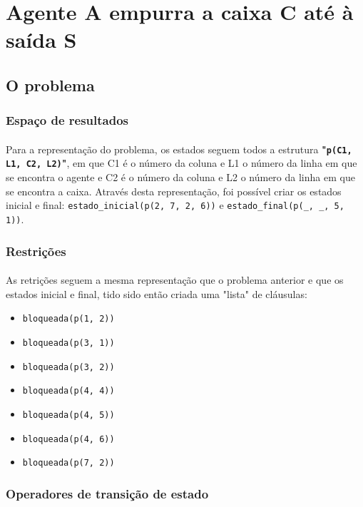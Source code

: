 \documentclass{article}
\begin{document}
\newpage

\section{Agente A empurra a caixa C até à saída S}
\subsection{O problema}
\subsubsection{Espaço de resultados}
\paragraph{} Para a representação do problema, os estados seguem todos a estrutura \textbf{"\texttt{p(C1, L1, C2, L2)}"}, em que C1 é o número da coluna e L1 o número da linha em que se encontra o agente e C2 é o número da coluna e L2 o número da linha em que se encontra a caixa. Através desta representação, foi possível criar os estados inicial e final: \texttt{estado\_inicial(p(2, 7, 2, 6))} e \texttt{estado\_final(p(\_, \_, 5, 1))}.

\subsubsection{Restrições}
\paragraph{} As retrições seguem a mesma representação que o problema anterior e que os estados inicial e final, tido sido então criada uma "lista" de cláusulas:
\begin{itemize}
  \item \texttt{bloqueada(p(1, 2))}
  \item \texttt{bloqueada(p(3, 1))}
  \item \texttt{bloqueada(p(3, 2))}
  \item \texttt{bloqueada(p(4, 4))}
  \item \texttt{bloqueada(p(4, 5))}
  \item \texttt{bloqueada(p(4, 6))}
  \item \texttt{bloqueada(p(7, 2))}
\end{itemize}

\subsubsection{Operadores de transição de estado}
\end{document}
